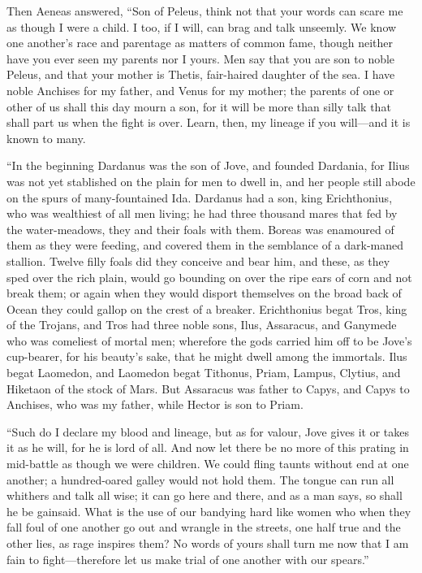 Then Aeneas answered, “Son of Peleus, think not that your words can scare
me as though I were a child. I too, if I will, can brag and talk unseemly.
We know one another’s race and parentage as matters of common fame, though
neither have you ever seen my parents nor I yours. Men say that you are
son to noble Peleus, and that your mother is Thetis, fair-haired daughter
of the sea. I have noble Anchises for my father, and Venus for my mother;
the parents of one or other of us shall this day mourn a son, for it will
be more than silly talk that shall part us when the fight is over. Learn,
then, my lineage if you will—and it is known to many.

“In the beginning Dardanus was the son of Jove, and founded Dardania, for
Ilius was not yet stablished on the plain for men to dwell in, and her
people still abode on the spurs of many-fountained Ida. Dardanus had a
son, king Erichthonius, who was wealthiest of all men living; he had three
thousand mares that fed by the water-meadows, they and their foals with
them. Boreas was enamoured of them as they were feeding, and covered them
in the semblance of a dark-maned stallion. Twelve filly foals did they
conceive and bear him, and these, as they sped over the rich plain, would
go bounding on over the ripe ears of corn and not break them; or again
when they would disport themselves on the broad back of Ocean they could
gallop on the crest of a breaker. Erichthonius begat Tros, king of the
Trojans, and Tros had three noble sons, Ilus, Assaracus, and Ganymede who
was comeliest of mortal men; wherefore the gods carried him off to be
Jove’s cup-bearer, for his beauty’s sake, that he might dwell among the
immortals. Ilus begat Laomedon, and Laomedon begat Tithonus, Priam,
Lampus, Clytius, and Hiketaon of the stock of Mars. But Assaracus was
father to Capys, and Capys to Anchises, who was my father, while Hector is
son to Priam.

“Such do I declare my blood and lineage, but as for valour, Jove gives it
or takes it as he will, for he is lord of all. And now let there be no
more of this prating in mid-battle as though we were children. We could
fling taunts without end at one another; a hundred-oared galley would not
hold them. The tongue can run all whithers and talk all wise; it can go
here and there, and as a man says, so shall he be gainsaid. What is the
use of our bandying hard like women who when they fall foul of one another
go out and wrangle in the streets, one half true and the other lies, as
rage inspires them? No words of yours shall turn me now that I am fain to
fight—therefore let us make trial of one another with our spears.”


